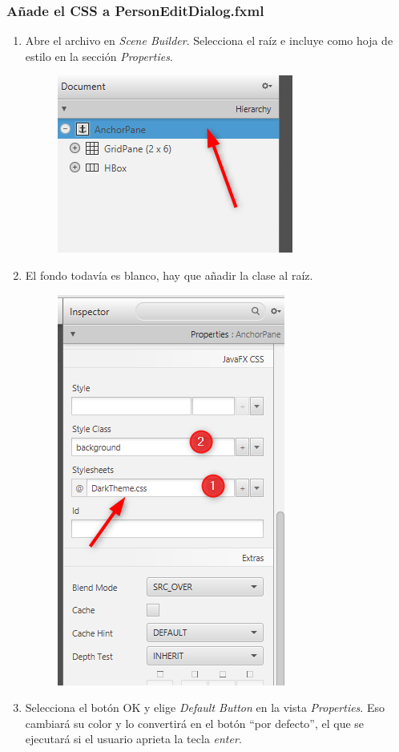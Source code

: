 \subsubsection*{Añade el CSS a PersonEditDialog.fxml}
\begin{enumerate}
    \item Abre el archivo  en \textit{Scene Builder}. Selecciona el  
    raíz e incluye  como hoja de estilo en la sección \textit{Properties}.
    \begin{figure}[H]
        \includegraphics{img/6-3-SelectAnchorPane.png}
    \end{figure}
    \item El fondo todavía es blanco, hay que añadir la clase  al  raíz.
    \begin{figure}[H]
        \includegraphics{img/6-4-AddCSS.png}
    \end{figure}
    \item Selecciona el botón OK y elige \textit{Default Button} en la vista \textit{Properties}. Eso cambiará su 
    color y lo convertirá en el botón “por defecto”, el que se ejecutará si el usuario aprieta la tecla \textit{enter}.
\end{enumerate}
